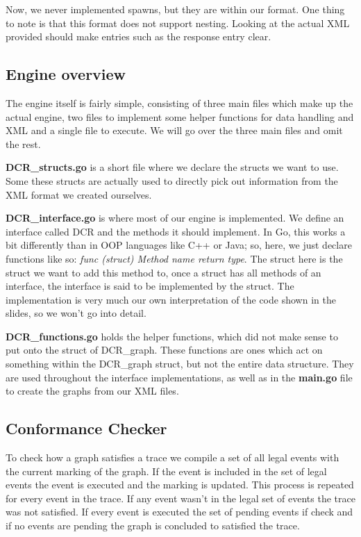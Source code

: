 Now, we never implemented spawns, but they are within our format. One thing to note is that this
format does not support nesting. Looking at the actual XML provided should make entries such as the
response entry clear.

\subsection*{Engine overview}
The engine itself is fairly simple, consisting of three main files which make up the actual engine,
two files to implement some helper functions for data handling and XML and a single file to
execute. We will go over the three main files and omit the rest.

\textbf{DCR\_structs.go} is a short file where we declare the structs we want to use. Some these
structs are actually used to directly pick out information from the XML format we created
ourselves.

\textbf{DCR\_interface.go} is where most of our engine is implemented. We define an interface
called DCR and the methods it should implement. In Go, this works a bit differently than in OOP
languages like C++ or Java; so, here, we just declare functions like so: \textit{func (struct)
Method name return type}. The struct here is the struct we want to add this method to, once
a struct has all methods of an interface, the interface is said to be implemented by the struct.
The implementation is very much our own interpretation of the code shown in the slides, so we won't
go into detail.

\textbf{DCR\_functions.go} holds the helper functions, which did not make sense to put onto the
struct of DCR\_graph. These functions are ones which act on something within the DCR\_graph struct,
but not the entire data structure. They are used throughout the interface implementations, as well as in the
\textbf{main.go} file to create the graphs from our XML files.

\subsection*{Conformance Checker}
To check how a graph satisfies a trace we compile a set of all legal events
with the current marking of the graph. If the event is included in the set of legal
events the event is executed and the marking is updated. This process is repeated
for every event in the trace. If any event wasn't in the legal set of events the trace was not
satisfied. If every event is executed the set of pending events if check and if no
events are pending the graph is concluded to satisfied the trace.

